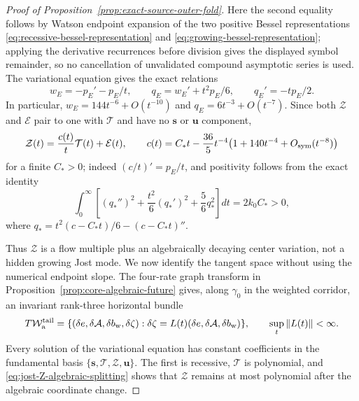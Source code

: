 \documentclass[11pt]{amsart}
\numberwithin{equation}{section}
\theoremstyle{definition}
\theoremstyle{remark}
\newcommand{\cA}{\mathcal A}
\begin{document}
\begin{proof}[Proof of Proposition~\ref{prop:exact-source-outer-fold}]
Here the second equality follows by Watson endpoint expansion of the two
positive Bessel representations
\eqref{eq:recessive-bessel-representation} and
\eqref{eq:growing-bessel-representation}; applying
the derivative recurrences before division gives the displayed symbol
remainder, so no cancellation of unvalidated compound asymptotic series is
used.
The variational equation gives the exact relations
\begin{equation}\label{eq:jost-algebraic-gauge}
 w_E=-p_E'-p_E/t,\qquad
 q_E=w_E'+t^2p_E/6,\qquad q_E'=-tp_E/2.
\end{equation}
In particular,
$w_E=144t^{-6}+O(t^{-10})$ and
$q_E=6t^{-3}+O(t^{-7})$.  Since both $\mathcal Z$ and $\mathcal E$ pair
to one with $\mathcal T$ and have no $\mathbf s$ or $\mathbf u$ component,
\begin{equation}\label{eq:jost-Z-algebraic-splitting}
 \mathcal Z(t)=\frac{c(t)}t\mathcal T(t)+\mathcal E(t),
 \qquad
 c(t)=C_*t-\frac{36}{5}t^{-4}
       \bigl(1+140t^{-4}+O_{\rm sym}(t^{-8})\bigr)
\end{equation}
for a finite $C_*>0$; indeed
$(c/t)'=p_E/t$, and positivity follows from the exact identity
\begin{equation}\label{eq:jost-connection-positivity}
 \int_0^\infty\left[(q_*'')^2+\frac{t^2}{6}(q_*')^2
       +\frac56q_*^2\right]dt=2k_0C_*>0,
\end{equation}
where
$q_*=t^2(c-C_*t)/6-(c-C_*t)''$.

Thus $\mathcal Z$ is a flow multiple plus an algebraically decaying center
variation, not a hidden growing Jost mode.  We now identify the tangent
space without using the numerical endpoint slope.  The four-rate graph
transform in Proposition~\ref{prop:core-algebraic-future} gives, along
$\gamma_0$ in the weighted corridor, an invariant rank-three horizontal
bundle
\begin{equation}\label{eq:weighted-horizontal-tangent}
 T\mathcal W_{\rm a}^{\rm tail}
 =\{(\delta e,\delta\cA,\delta b_{\rm w},\delta\zeta):
     \delta\zeta=L(t)(\delta e,\delta\cA,\delta b_{\rm w})\},
 \qquad \sup_t\|L(t)\|<\infty.
\end{equation}
Every solution of the variational equation has constant coefficients in
the fundamental basis
$\{\mathbf s,\mathcal T,\mathcal Z,\mathbf u\}$.  The first is recessive,
$\mathcal T$ is polynomial, and
\eqref{eq:jost-Z-algebraic-splitting} shows that $\mathcal Z$ remains at
most polynomial after the algebraic coordinate change.


\end{proof}
\end{document}
